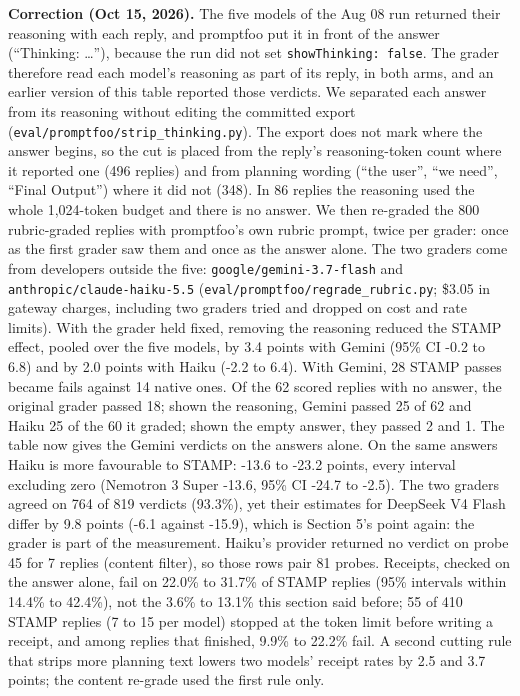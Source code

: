 \documentclass[
  11pt,
]{article}
\begin{document}
\textbf{Correction (Oct 15, 2026).} The five models of the Aug 08 run
returned their reasoning with each reply, and promptfoo put it in front
of the answer (``Thinking: \ldots{}''), because the run did not set
\texttt{showThinking:\ false}. The grader therefore read each model's
reasoning as part of its reply, in both arms, and an earlier version of
this table reported those verdicts. We separated each answer from its
reasoning without editing the committed export
(\texttt{eval/promptfoo/strip\_thinking.py}). The export does not mark
where the answer begins, so the cut is placed from the reply's
reasoning-token count where it reported one (496 replies) and from
planning wording (``the user'', ``we need'', ``Final Output'') where it
did not (348). In 86 replies the reasoning used the whole 1,024-token
budget and there is no answer. We then re-graded the 800 rubric-graded
replies with promptfoo's own rubric prompt, twice per grader: once as
the first grader saw them and once as the answer alone. The two graders
come from developers outside the five: \texttt{google/gemini-3.7-flash}
and \texttt{anthropic/claude-haiku-5.5}
(\texttt{eval/promptfoo/regrade\_rubric.py}; \$3.05 in gateway charges,
including two graders tried and dropped on cost and rate limits). With
the grader held fixed, removing the reasoning reduced the STAMP effect,
pooled over the five models, by 3.4 points with Gemini (95\% CI -0.2 to
6.8) and by 2.0 points with Haiku (-2.2 to 6.4). With Gemini, 28 STAMP
passes became fails against 14 native ones. Of the 62 scored replies
with no answer, the original grader passed 18; shown the reasoning,
Gemini passed 25 of 62 and Haiku 25 of the 60 it graded; shown the empty
answer, they passed 2 and 1. The table now gives the Gemini verdicts on
the answers alone. On the same answers Haiku is more favourable to
STAMP: -13.6 to -23.2 points, every interval excluding zero (Nemotron 3
Super -13.6, 95\% CI -24.7 to -2.5). The two graders agreed on 764 of
819 verdicts (93.3\%), yet their estimates for DeepSeek V4 Flash differ
by 9.8 points (-6.1 against -15.9), which is Section 5's point again:
the grader is part of the measurement. Haiku's provider returned no
verdict on probe 45 for 7 replies (content filter), so those rows pair
81 probes. Receipts, checked on the answer alone, fail on 22.0\% to
31.7\% of STAMP replies (95\% intervals within 14.4\% to 42.4\%), not
the 3.6\% to 13.1\% this section said before; 55 of 410 STAMP replies (7
to 15 per model) stopped at the token limit before writing a receipt,
and among replies that finished, 9.9\% to 22.2\% fail. A second cutting
rule that strips more planning text lowers two models' receipt rates by
2.5 and 3.7 points; the content re-grade used the first rule only.
\end{document}
